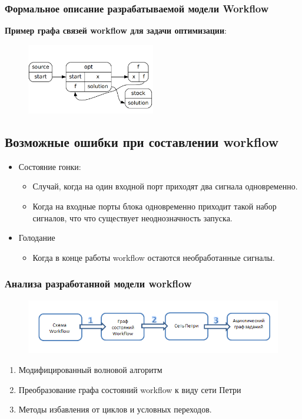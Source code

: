 \documentclass[10pt,pdf,hyperref={unicode}]{beamer}
\begin{document}
\begin{frame}
\frametitle{Формальное описание разрабатываемой модели Workflow}

\textbf{Пример графа связей workflow для задачи оптимизации}:
\begin{figure}[here]
    \centering
    \includegraphics[width=0.5\textwidth]{optimization_workflow.png}
\end{figure}   
\end{frame}

\begin{frame}
\subsection{Возможные ошибки при составлении workflow}
\begin{itemize}
\item<1-3> 
Состояние гонки:
\begin{itemize}
\item<2-3> Случай, когда на один входной порт приходят два сигнала одновременно.
\item<3> Когда на входные порты блока одновременно приходит такой набор сигналов, что что существует неоднозначность запуска.
\end{itemize}

\item<4> Голодание
\begin{itemize}
\item<4> Когда в конце работы workflow остаются необработанные сигналы.
\end{itemize}
\end{itemize}
\end{frame}


\begin{frame}
\frametitle{Анализа разработанной модели workflow}

\begin{figure}[here]
    \centering
    \includegraphics[width=\textwidth]{analys_plan.png}
    \label{img:opt_wf}
\end{figure}

\begin{enumerate}
\item Модифицированный волновой алгоритм
\item Преобразование графа состояний workflow к виду сети Петри
\item Методы избавления от циклов и условных переходов.
\end{enumerate}
\end{frame}
\end{document}
